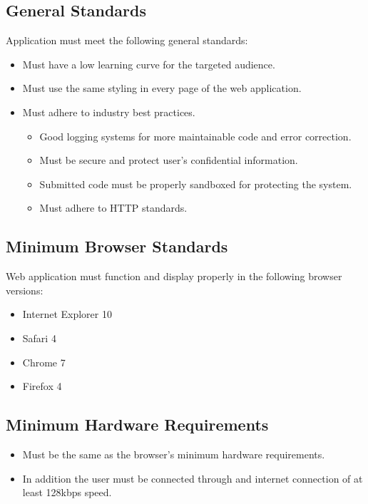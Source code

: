 \label{sec:stand}
\subsection{General Standards}

Application must meet the following general standards:

\begin{itemize}
\item Must have a low learning curve for the targeted audience.
\item Must use the same styling in every page of the web application.
\item Must adhere to industry best practices.
\begin{itemize}
\item Good logging systems for more maintainable code and error correction.
\item Must be secure and protect user's confidential information.
\item Submitted code must be properly sandboxed for protecting the system.
\item Must adhere to HTTP standards.
\end{itemize}
\end{itemize}

\subsection{Minimum Browser Standards}

Web application must function and display properly in the following browser
versions:
\begin{itemize}
\item Internet Explorer 10
\item Safari 4
\item Chrome 7
\item Firefox 4
\end{itemize}

\subsection{Minimum Hardware Requirements}
\begin{itemize}
\item Must be the same as the browser's minimum hardware requirements.
\item In addition the user must be connected through and internet connection of
at least 128kbps speed.
\end{itemize}
